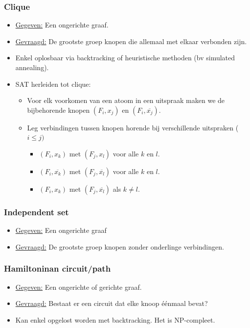 \documentclass{report}
\begin{document}
\subsubsection{Clique}
\begin{itemize}
	\item[\info] \underline{Gegeven:} Een ongerichte graaf.
	\item[\info] \underline{Gevraagd:} De grootste groep knopen die allemaal met elkaar verbonden zijn.
	\item[\info] Enkel oplosbaar via backtracking of heuristische methoden (bv simulated annealing).
	\item[\info] SAT herleiden tot clique:
	\begin{itemize}
		\item Voor elk voorkomen van een atoom in een uitspraak maken we de bijbehorende knopen $(F_i, x_j)$ en $(F_i, \overline{x_j})$.
		\item Leg verbindingen tussen knopen horende bij verschillende uitspraken ($i \leq j)$
		\begin{itemize}
			\item $(F_i, x_k)$ met $(F_j, x_l)$ voor alle $k$ en $l$.
			\item $(F_i, \overline{x_k})$ met $(F_j, \overline{x_l})$ voor alle $k$ en $l$.
			\item $(F_i, x_k)$ met $(F_j, \overline{x_l})$ als $k \neq l$.
		\end{itemize}
	\end{itemize}
\end{itemize}

\subsubsection{Independent set}
\begin{itemize}
	\item[\info] \underline{Gegeven:} Een ongerichte graaf
	\item[\info] \underline{Gevraagd:} De grootste groep knopen zonder onderlinge verbindingen.
\end{itemize}

\subsubsection{Hamiltoninan circuit/path}
\begin{itemize}
	\item[\info] \underline{Gegeven:} Een ongerichte of gerichte graaf.
	\item[\info] \underline{Gevraagd:} Bestaat er een circuit dat elke knoop éénmaal bevat?
	\item[\info] Kan enkel opgelost worden met backtracking. Het is NP-compleet.
\end{itemize}
\end{document}
